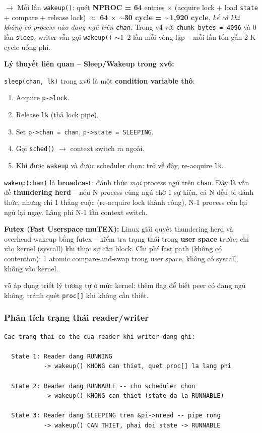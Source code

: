 \documentclass[11pt,a4paper]{article}
\begin{document}
$\rightarrow$ Mỗi lần \texttt{wakeup()}: quét \textbf{NPROC = 64} entries $\times$ (acquire lock + load \texttt{state} + compare + release lock) $\approx$ \textbf{64 $\times$ $\sim$30 cycle = $\sim$1{,}920 cycle}, \emph{kể cả khi không có process nào đang ngủ trên \texttt{chan}}. Trong v4 với \texttt{chunk\_bytes = 4096} và 0 lần \texttt{sleep}, writer vẫn gọi \texttt{wakeup()} $\sim 1$--$2$ lần mỗi vòng lặp -- mỗi lần tốn gần 2 K cycle uổng phí.

\begin{callout}
\textbf{Lý thuyết liên quan -- Sleep/Wakeup trong xv6:}

\texttt{sleep(chan, lk)} trong xv6 là một \textbf{condition variable thô}:
\begin{enumerate}
  \item Acquire \texttt{p->lock}.
  \item Release \texttt{lk} (thả lock pipe).
  \item Set \texttt{p->chan = chan}, \texttt{p->state = SLEEPING}.
  \item Gọi \texttt{sched()} $\rightarrow$ context switch ra ngoài.
  \item Khi được \texttt{wakeup} và được scheduler chọn: trở về đây, re-acquire \texttt{lk}.
\end{enumerate}

\texttt{wakeup(chan)} là \textbf{broadcast}: đánh thức \emph{mọi} process ngủ trên \texttt{chan}. Đây là vấn đề \textbf{thundering herd} -- nếu N process cùng ngủ chờ 1 sự kiện, cả N đều bị đánh thức, nhưng chỉ 1 thắng cuộc (re-acquire lock thành công), N-1 process còn lại ngủ lại ngay. Lãng phí N-1 lần context switch.

\textbf{Futex (Fast Userspace muTEX):} Linux giải quyết thundering herd và overhead wakeup bằng futex -- kiểm tra trạng thái trong \textbf{user space} trước; chỉ vào kernel (syscall) khi thực sự cần block. Chi phí fast path (không có contention): 1 atomic compare-and-swap trong user space, không có syscall, không vào kernel.

v5 áp dụng triết lý tương tự ở mức kernel: thêm flag để biết peer có đang ngủ không, tránh quét \texttt{proc[]} khi không cần thiết.
\end{callout}

\subsubsection{Phân tích trạng thái reader/writer}

\begin{lstlisting}[style=plain]
  Cac trang thai co the cua reader khi writer dang ghi:

  State 1: Reader dang RUNNING
           -> wakeup() KHONG can thiet, quet proc[] la lang phi

  State 2: Reader dang RUNNABLE -- cho scheduler chon
           -> wakeup() KHONG can thiet (state da la RUNNABLE)

  State 3: Reader dang SLEEPING tren &pi->nread -- pipe rong
           -> wakeup() CAN THIET, phai doi state -> RUNNABLE
\end{lstlisting}
\end{document}
